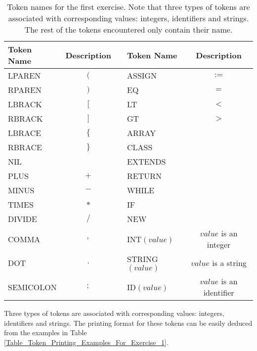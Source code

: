 \documentclass{article}
\begin{document}
\begin{table}[h]
\centering
\begin{tabular}{|l|c|c|l|c|}
\hline
Token Name & Description & & Token Name & Description \\
\hline
\hline
LPAREN    & $($  & & ASSIGN           & $:=$                     \\
RPAREN    & $)$  & & EQ               & $=$                      \\
LBRACK    & $[$  & & LT               & $<$                      \\
RBRACK    & $]$  & & GT               & $>$                      \\
LBRACE    & $\{$ & & ARRAY            &                          \\
RBRACE    & $\}$ & & CLASS            &                          \\
NIL       &      & & EXTENDS          &                          \\
PLUS      & $+$  & & RETURN           &                          \\
MINUS     & $-$  & & WHILE            &                          \\
TIMES     & $*$  & & IF               &                          \\
DIVIDE    & $/$  & & NEW              &                          \\
COMMA     & $,$  & & INT$(value)$     & $value$ is an integer    \\
DOT       & $.$  & & STRING$(value)$  & $value$ is a string      \\
SEMICOLON & $;$  & & ID$(value)$      & $value$ is an identifier \\
\hline
\end{tabular}
\caption{
Token names for the first exercise.
Note that three types of tokens are associated with corresponding values:
integers, identifiers and strings.
The rest of the tokens encountered only contain their name.
\label{Table_Token_Names_For_Exercise_1}}
\end{table}
Three types of tokens are associated with corresponding values: integers, identifiers and strings.
The printing format for these tokens can be easily deduced from the examples in Table
\ref{Table_Token_Printing_Examples_For_Exercise_1}.
\end{document}
